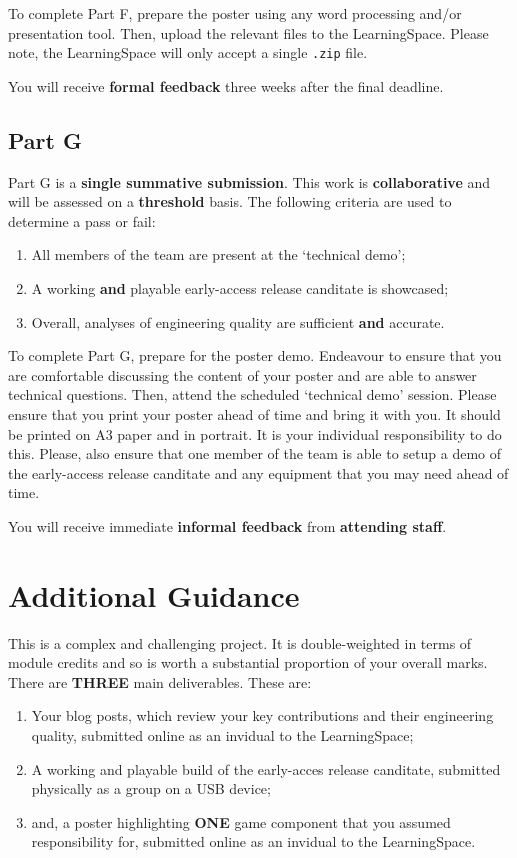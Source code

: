 \documentclass{../../fal_assignment}
\begin{document}
To complete Part F, prepare the poster using any word processing and/or presentation tool. Then, upload the relevant files to the LearningSpace. Please note, the LearningSpace will only accept a single \texttt{.zip} file.

You will receive \textbf{formal feedback} three weeks after the final deadline.

\subsection*{Part G}

Part G is a \textbf{single summative submission}. This work is \textbf{collaborative} and will be assessed on a \textbf{threshold} basis. The following criteria are used to determine a pass or fail:

\begin{enumerate}[label=(\alph*)]
	\item All members of the team are present at the `technical demo';
		\item A working \textbf{and} playable early-access release canditate is showcased;
	\item Overall, analyses of engineering quality are sufficient \textbf{and} accurate.
\end{enumerate}

To complete Part G, prepare for the poster demo. Endeavour to ensure that you are comfortable discussing the content of your poster and are able to answer technical questions. Then, attend the scheduled `technical demo' session. Please ensure that you print your poster ahead of time and bring it with you. It should be printed on A3 paper and in portrait. It is your individual responsibility to do this. Please, also ensure that one member of the team is able to setup a demo of the early-access release canditate and any  equipment that you may need ahead of time.

You will receive immediate \textbf{informal feedback} from \textbf{attending staff}.

\section*{Additional Guidance}

This is a complex and challenging project. It is double-weighted in terms of module credits and so is worth a substantial proportion of your overall marks. There are \textbf{THREE} main deliverables. These are:

\begin{enumerate}[label=(\roman*)]
	\item Your blog posts, which review your key contributions and their engineering quality, submitted online as an invidual to the LearningSpace;
		\item A working and playable build of the early-acces release canditate, submitted physically as a group on a USB device;
	\item and, a poster highlighting \textbf{ONE} game component that you assumed responsibility for, submitted online as an invidual to the LearningSpace.
\end{enumerate}
\end{document}
